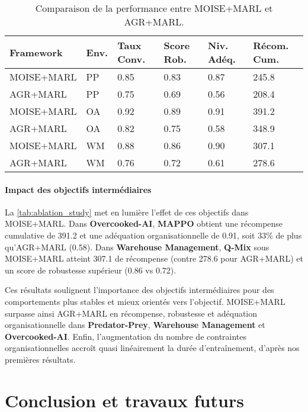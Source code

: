 \documentclass[dissemination]{jfsma}
\begin{document}
\begin{table}[h!]
    \centering
    \caption{Comparaison de la performance entre MOISE+MARL et AGR+MARL.}
    \label{tab:ablation_study}
    \small
    \renewcommand{\arraystretch}{1.1}
    \begin{tabular}{p{2.1cm}p{0.5cm}p{0.7cm}p{0.7cm}p{0.6cm}p{0.9cm}}
        \hline
        \textbf{Framework} & \textbf{Env.} & \textbf{Taux Conv.} & \textbf{Score Rob.} & \textbf{Niv. Adéq.} & \textbf{Récom. Cum.} \\ \hline
        MOISE+MARL & PP & 0.85 & 0.83 & 0.87 & 245.8 \\
        AGR+MARL & PP & 0.75 & 0.69 & 0.56 & 208.4 \\
        MOISE+MARL & OA & 0.92 & 0.89 & 0.91 & 391.2 \\
        AGR+MARL & OA & 0.82 & 0.75 & 0.58 & 348.9 \\
        MOISE+MARL & WM & 0.88 & 0.86 & 0.90 & 307.1 \\
        AGR+MARL & WM & 0.76 & 0.72 & 0.61 & 278.6 \\ \hline
    \end{tabular}
\end{table}

\paragraph{Impact des objectifs intermédiaires}
La \autoref{tab:ablation_study} met en lumière l’effet de ces objectifs dans MOISE+MARL. Dans \textbf{Overcooked-AI}, \textbf{MAPPO} obtient une récompense cumulative de 391.2 et une adéquation organisationnelle de 0.91, soit 33\% de plus qu’AGR+MARL (0.58). Dans \textbf{Warehouse Management}, \textbf{Q-Mix} sous MOISE+MARL atteint 307.1 de récompense (contre 278.6 pour AGR+MARL) et un score de robustesse supérieur (0.86 vs 0.72).

Ces résultats soulignent l’importance des objectifs intermédiaires pour des comportements plus stables et mieux orientés vers l’objectif. MOISE+MARL surpasse ainsi AGR+MARL en récompense, robustesse et adéquation organisationnelle dans \textbf{Predator-Prey}, \textbf{Warehouse Management} et \textbf{Overcooked-AI}.
%
Enfin, l’augmentation du nombre de contraintes organisationnelles accroît quasi linéairement la durée d’entraînement, d’après nos premières résultats\footnotemark[1].

\section{Conclusion et travaux futurs}
\label{sec:discussion_conclusion_future_work}
\end{document}
